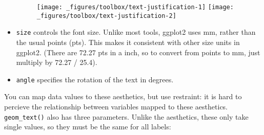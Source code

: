 \begin{itemize}
\begin{Shaded}
\begin{Highlighting}[]
\StringTok{ }\NormalTok{(}
   \NormalTok{(}\NormalTok{, }\NormalTok{, }\NormalTok{, }\NormalTok{, }\NormalTok{),}
   \NormalTok{(}\NormalTok{, }\NormalTok{, }\NormalTok{, }\NormalTok{, }\NormalTok{),}
   \NormalTok{(}
    \NormalTok{, }\NormalTok{, }
    \NormalTok{, }\NormalTok{, }
\NormalTok{  )}
\NormalTok{)}
\OperatorTok{+}
\StringTok{  }\NormalTok{(}\NormalTok{(}
\OperatorTok{+}
\StringTok{  }\NormalTok{(}\NormalTok{(} \NormalTok{, } \NormalTok{)}
\end{Highlighting}
\end{Shaded}

  \begin{figure}[H]
    \texttt{[image: \_figures/toolbox/text-justification-1]}%
    \texttt{[image: \_figures/toolbox/text-justification-2]}
  \end{figure}
\item
  \texttt{size} controls the font size. Unlike most tools, ggplot2 uses
  mm, rather than the usual points (pts). This makes it consistent with
  other size units in ggplot2. (There are 72.27 pts in a inch, so to
  convert from points to mm, just multiply by 72.27 / 25.4).
\item
  \texttt{angle} specifies the rotation of the text in degrees.
\end{itemize}

You can map data values to these aesthetics, but use restraint: it is
hard to percieve the relationship between variables mapped to these
aesthetics. \texttt{geom\_text()} also has three parameters. Unlike the
aesthetics, these only take single values, so they must be the same for
all labels:

